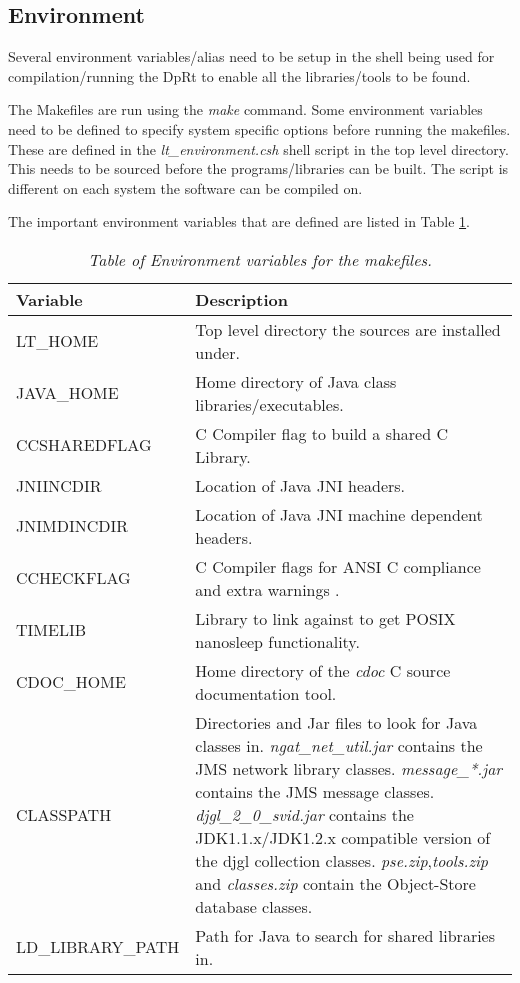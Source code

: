 \documentclass[10pt,a4paper]{article}
\begin{document}
\subsection{Environment}
Several environment variables/alias need to be setup in the shell being used for compilation/running the
DpRt to enable all the libraries/tools to be found.

The Makefiles are run using the {\em make} command. Some environment variables need to be defined to specify
system specific options before running the makefiles. These are defined in the {\em lt\_environment.csh}
shell script in the top level directory. This needs to be sourced before the programs/libraries can be built.
The script is different on each system the software can be compiled on.

The important environment variables that are defined are listed in Table \ref{tab:makeenv}.

\begin{table}[!h]
\begin{center}
\begin{footnotesize}
\begin{tabular}{|l|p{40em}|} \hline
{\bf Variable} 	& {\bf Description} \\ \hline
LT\_HOME	& Top level directory the sources are installed under. \\ \hline
JAVA\_HOME	& Home directory of Java class libraries/executables. \\ \hline
CCSHAREDFLAG	& C Compiler flag to build a shared C Library. \\ \hline
JNIINCDIR	& Location of Java JNI headers. \\ \hline
JNIMDINCDIR	& Location of Java JNI machine dependent headers. \\ \hline
CCHECKFLAG	& C Compiler flags for ANSI C compliance and extra warnings \footnotemark. \\ \hline
TIMELIB		& Library to link against to get POSIX nanosleep functionality. \\ \hline
CDOC\_HOME	& Home directory of the {\em cdoc} C source documentation tool. \\ \hline
CLASSPATH	& Directories and Jar files to look for Java classes in. 
{\em ngat\_net\_util.jar} contains the JMS network library classes. 
{\em message\_*.jar} contains the JMS message classes. 
{\em djgl\_2\_0\_svid.jar} contains the JDK1.1.x/JDK1.2.x compatible version of the djgl collection classes. 
{\em pse.zip},{\em tools.zip} and {\em classes.zip} contain the Object-Store database classes.  \\ \hline
LD\_LIBRARY\_PATH & Path for Java to search for shared libraries in.  \\ \hline
\end{tabular}
\end{footnotesize}
\end{center}
\caption{\em Table of Environment variables for the makefiles.}
\label{tab:makeenv} 
\end{table}
\end{document}
